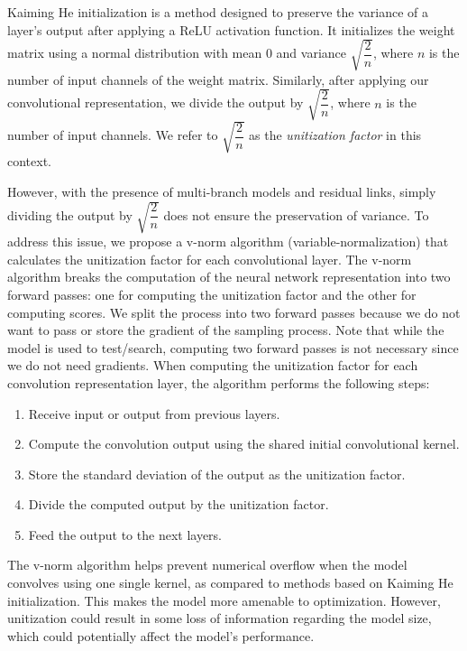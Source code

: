\documentclass[lettersize,journal]{IEEEtran}
\begin{document}
        Kaiming He initialization is a method designed to preserve the variance of a layer's output after applying a ReLU activation function. It initializes the weight matrix using a normal distribution with mean 0 and variance $\sqrt{\dfrac{2}{n}}$, where $n$ is the number of input channels of the weight matrix. Similarly, after applying our convolutional representation, we divide the output by $\sqrt{\dfrac{2}{n}}$, where $n$ is the number of input channels. We refer to $\sqrt{\dfrac{2}{n}}$ as the \emph{unitization factor} in this context.
        
        However, with the presence of multi-branch models and residual links, simply dividing the output by $\sqrt{\dfrac{2}{n}}$ does not ensure the preservation of variance. To address this issue, we propose a v-norm algorithm (variable-normalization) that calculates the unitization factor for each convolutional layer. The v-norm algorithm breaks the computation of the neural network representation into two forward passes: one for computing the unitization factor and the other for computing scores. We split the process into two forward passes because we do not want to pass or store the gradient of the sampling process. Note that while the model is used to test/search, computing two forward passes is not necessary since we do not need gradients. When computing the unitization factor for each convolution representation layer, the algorithm performs the following steps:
        
        \begin{enumerate}
        \item Receive input or output from previous layers.
        \item Compute the convolution output using the shared initial convolutional kernel.
        \item Store the standard deviation of the output as the unitization factor.
        \item Divide the computed output by the unitization factor.
        \item Feed the output to the next layers.
        \end{enumerate}

        The v-norm algorithm helps prevent numerical overflow when the model convolves using one single kernel, as compared to methods based on Kaiming He initialization. This makes the model more amenable to optimization. However, unitization could result in some loss of information regarding the model size, which could potentially affect the model's performance.
\end{document}
